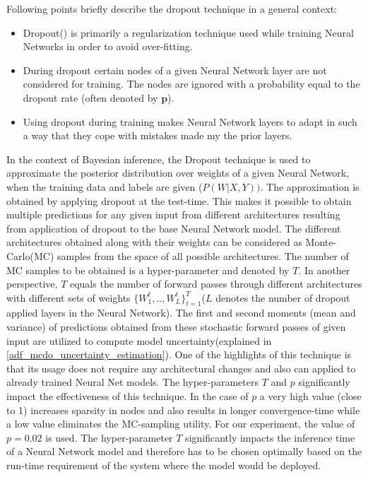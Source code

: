	Following points briefly describe the dropout technique in a general context:
	\begin{itemize}
		\item Dropout(\cite{srivastava2014dropout}) is primarily a regularization technique used while training Neural Networks in order to avoid over-fitting.
		\item During dropout certain nodes of a given Neural Network layer are not considered for training. The nodes are ignored with a probability equal to the dropout rate (often denoted by $\textbf{p}$).
		\item Using dropout during training makes Neural Network layers to adapt in such a way that they cope with mistakes made my the prior layers. 
		
	\end{itemize}
	
	In the context of Bayesian inference, the Dropout technique is used to approximate the posterior distribution over weights of a given Neural Network, when the training data and labels are given ($P(W|X,Y))$. The approximation is obtained by applying dropout at the test-time. This makes it possible to obtain multiple predictions for any given input from different architectures resulting from application of dropout to the base Neural Network model. The different architectures obtained along with their weights can be considered as Monte-Carlo(MC) samples from the space of all possible architectures. The number of MC samples to be obtained is a hyper-parameter and denoted by $T$. In another perspective, $T$ equals the number of forward passes through different architectures with different sets of weights $\{W_{1}^t,..,W_{L}^t\}_{t=1}^T$($L$ denotes the number of dropout applied layers in the Neural Network). The first and second moments (mean and variance) of predictions obtained from these stochastic forward passes of given input are utilized to compute model uncertainty(explained in  \ref{adf_mcdo_uncertainty_estimation}). One of the highlights of this technique is that its usage does not require any architectural changes and also can applied to already trained Neural Net models. The hyper-parameters $T$ and $p$ significantly impact the effectiveness of this technique. In the case of $p$ a very high value (close to 1) increases sparsity in nodes and also results in longer convergence-time while a low value eliminates the MC-sampling utility. For our experiment, the value of $p=0.02$ is used. The hyper-parameter $T$ significantly impacts the inference time of a Neural Network model and therefore has to be chosen optimally based on the run-time requirement of the system where the model would be deployed.
	
